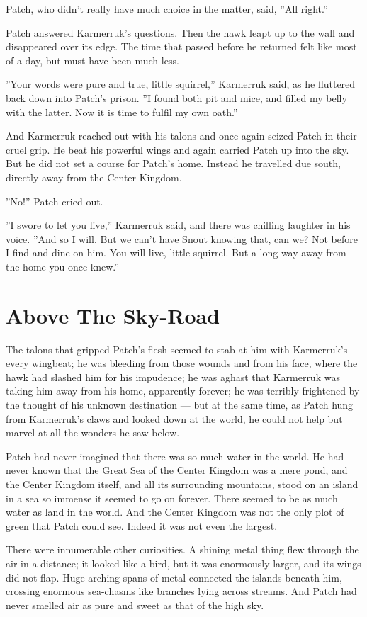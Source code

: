 \documentclass[12pt]{book}
\begin{document}
Patch, who didn't really have much choice in the matter, said, ''All
right.''

Patch answered Karmerruk's questions. Then the hawk leapt up to the
wall and disappeared over its edge. The time that passed before he
returned felt like most of a day, but must have been much less.

''Your words were pure and true, little squirrel,'' Karmerruk said, as
he fluttered back down into Patch's prison. ''I found both pit and
mice, and filled my belly with the latter. Now it is time to fulfil my
own oath.''

And Karmerruk reached out with his talons and once again seized Patch
in their cruel grip. He beat his powerful wings and again carried
Patch up into the sky. But he did not set a course for Patch's
home. Instead he travelled due south, directly away from the Center
Kingdom.

''No!'' Patch cried out.

''I swore to let you live,'' Karmerruk said, and there was chilling
laughter in his voice. ''And so I will. But we can't have Snout
knowing that, can we? Not before I find and dine on him. You will
live, little squirrel. But a long way away from the home you once
knew.''


\section{Above The Sky-Road}

The talons that gripped Patch's flesh seemed to stab at him with
Karmerruk's every wingbeat; he was bleeding from those wounds and from
his face, where the hawk had slashed him for his impudence; he was
aghast that Karmerruk was taking him away from his home, apparently
forever; he was terribly frightened by the thought of his unknown
destination --- but at the same time, as Patch hung from Karmerruk's
claws and looked down at the world, he could not help but marvel at
all the wonders he saw below.

Patch had never imagined that there was so much water in the world. He
had never known that the Great Sea of the Center Kingdom was a mere
pond, and the Center Kingdom itself, and all its surrounding
mountains, stood on an island in a sea so immense it seemed to go on
forever. There seemed to be as much water as land in the world. And
the Center Kingdom was not the only plot of green that Patch could
see. Indeed it was not even the largest.

There were innumerable other curiosities. A shining metal thing flew
through the air in a distance; it looked like a bird, but it was
enormously larger, and its wings did not flap. Huge arching spans of
metal connected the islands beneath him, crossing enormous sea-chasms
like branches lying across streams. And Patch had never smelled air as
pure and sweet as that of the high sky.
\end{document}
